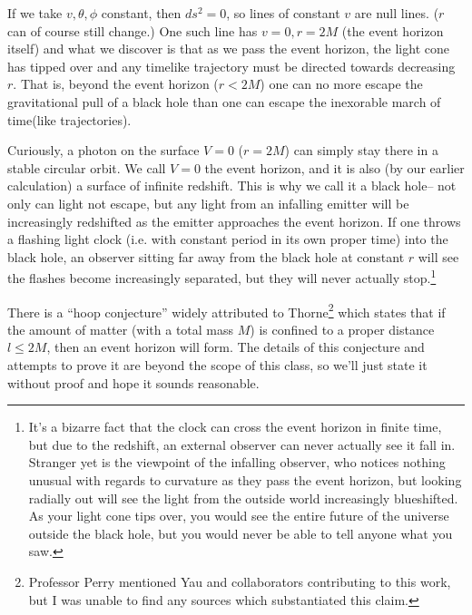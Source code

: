 If we take $v,\theta,\phi$ constant, then $ds^2=0$, so lines of constant $v$ are null lines. ($r$ can of course still change.) One such line has $v=0,r=2M$ (the event horizon itself) and what we discover is that as we pass the event horizon, the light cone has tipped over and any timelike trajectory must be directed towards decreasing $r$. That is, beyond the event horizon ($r<2M$) one can no more escape the gravitational pull of a black hole than one can escape the inexorable march of time(like trajectories).

Curiously, a photon on the surface $V=0$ ($r=2M$) can simply stay there in a stable circular orbit. We call $V=0$ the event horizon, and it is also (by our earlier calculation) a surface of infinite redshift. This is why we call it a black hole-- not only can light not escape, but any light from an infalling emitter will be increasingly redshifted as the emitter approaches the event horizon. If one throws a flashing light clock (i.e. with constant period in its own proper time) into the black hole, an observer sitting far away from the black hole at constant $r$ will see the flashes become increasingly separated, but they will never actually stop.\footnote{It's a bizarre fact that the clock can cross the event horizon in finite time, but due to the redshift, an external observer can never actually see it fall in. Stranger yet is the viewpoint of the infalling observer, who notices nothing unusual with regards to curvature as they pass the event horizon, but looking radially out will see the light from the outside world increasingly blueshifted. As your light cone tips over, you would see the entire future of the universe outside the black hole, but you would never be able to tell anyone what you saw.}

There is a ``hoop conjecture'' widely attributed to Thorne\footnote{Professor Perry mentioned Yau and collaborators contributing to this work, but I was unable to find any sources which substantiated this claim.} which states that if the amount of matter (with a total mass $M$) is confined to a proper distance $l\leq 2M$, then an event horizon will form. The details of this conjecture and attempts to prove it are beyond the scope of this class, so we'll just state it without proof and hope it sounds reasonable.


